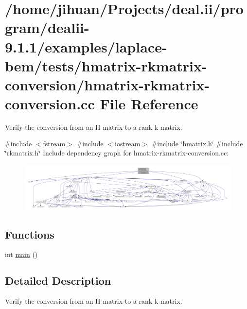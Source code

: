\hypertarget{hmatrix-rkmatrix-conversion_8cc}{}\section{/home/jihuan/\+Projects/deal.ii/program/dealii-\/9.1.1/examples/laplace-\/bem/tests/hmatrix-\/rkmatrix-\/conversion/hmatrix-\/rkmatrix-\/conversion.cc File Reference}
\label{hmatrix-rkmatrix-conversion_8cc}


Verify the conversion from an H-\/matrix to a rank-\/k matrix.  


{\ttfamily \#include $<$fstream$>$}\newline
{\ttfamily \#include $<$iostream$>$}\newline
{\ttfamily \#include \char`\"{}hmatrix.\+h\char`\"{}}\newline
{\ttfamily \#include \char`\"{}rkmatrix.\+h\char`\"{}}\newline
Include dependency graph for hmatrix-\/rkmatrix-\/conversion.cc\+:\nopagebreak
\begin{figure}[H]
\begin{center}
\leavevmode
\includegraphics[width=350pt]{hmatrix-rkmatrix-conversion_8cc__incl}
\end{center}
\end{figure}
\subsection*{Functions}
\begin{DoxyCompactItemize}
\item 
int \hyperlink{hmatrix-rkmatrix-conversion_8cc_ae66f6b31b5ad750f1fe042a706a4e3d4}{main} ()
\end{DoxyCompactItemize}


\subsection{Detailed Description}
Verify the conversion from an H-\/matrix to a rank-\/k matrix. 

